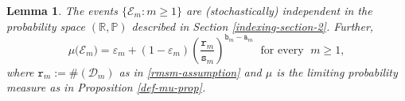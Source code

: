 \documentclass[12pt, twoside]{article}
\newtheorem{lemma}[theorem]{Lemma}
\theoremstyle{definition}
\numberwithin{equation}{section}
\begin{document}
\begin{lemma} \label{lemma-prob} 
The events $\{\mathscr{E}_m: m \geq 1\}$ are (stochastically) independent in the probability space $(\mathbb R, \mathbb P)$ described in Section \ref{indexing-section-2}. Further,  
\begin{equation} \label{prob}
\mu\bigl(\mathscr{E}_m \bigr) = \varepsilon_m + (1 - \varepsilon_m) \left(\frac{\mathtt r_m}{\mathtt s_m} \right)^{\mathtt b_m - \mathtt a_m} \; \text{ for every } \;  m \geq 1,
\end{equation} 
where $\mathtt r_m := \#(\mathscr{D}_m)$ as in \eqref{rmsm-assumption} and $\mu$ is the limiting probability measure as in Proposition \ref{def-mu-prop}. 
\end{lemma} 
\end{document}
